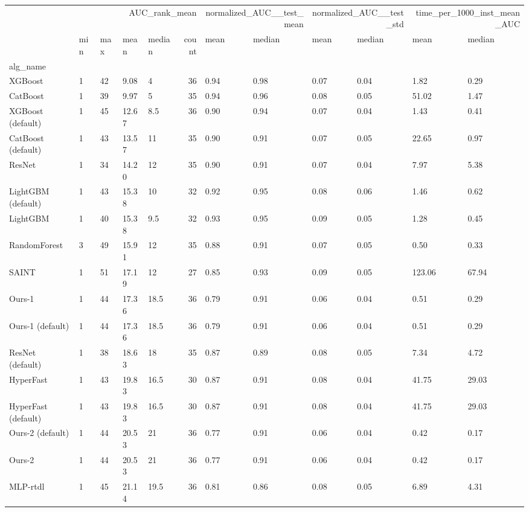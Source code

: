 \begin{tabular}{lllllrllllll}
\toprule
 & \multicolumn{5}{r}{AUC_rank_mean} & \multicolumn{2}{r}{normalized_AUC__test_mean} & \multicolumn{2}{r}{normalized_AUC__test_std} & \multicolumn{2}{r}{time_per_1000_inst_mean_AUC} \\
 & min & max & mean & median & count & mean & median & mean & median & mean & median \\
alg_name &  &  &  &  &  &  &  &  &  &  &  \\
\midrule
XGBoost & 1 & 42 & 9.08 & 4 & 36 & 0.94 & 0.98 & 0.07 & 0.04 & 1.82 & 0.29 \\
CatBoost & 1 & 39 & 9.97 & 5 & 35 & 0.94 & 0.96 & 0.08 & 0.05 & 51.02 & 1.47 \\
XGBoost (default) & 1 & 45 & 12.67 & 8.5 & 36 & 0.90 & 0.94 & 0.07 & 0.04 & 1.43 & 0.41 \\
CatBoost (default) & 1 & 43 & 13.57 & 11 & 35 & 0.90 & 0.91 & 0.07 & 0.05 & 22.65 & 0.97 \\
ResNet & 1 & 34 & 14.20 & 12 & 35 & 0.90 & 0.91 & 0.07 & 0.04 & 7.97 & 5.38 \\
LightGBM (default) & 1 & 43 & 15.38 & 10 & 32 & 0.92 & 0.95 & 0.08 & 0.06 & 1.46 & 0.62 \\
LightGBM & 1 & 40 & 15.38 & 9.5 & 32 & 0.93 & 0.95 & 0.09 & 0.05 & 1.28 & 0.45 \\
RandomForest & 3 & 49 & 15.91 & 12 & 35 & 0.88 & 0.91 & 0.07 & 0.05 & 0.50 & 0.33 \\
SAINT & 1 & 51 & 17.19 & 12 & 27 & 0.85 & 0.93 & 0.09 & 0.05 & 123.06 & 67.94 \\
Ours-1 & 1 & 44 & 17.36 & 18.5 & 36 & 0.79 & 0.91 & 0.06 & 0.04 & 0.51 & 0.29 \\
Ours-1 (default) & 1 & 44 & 17.36 & 18.5 & 36 & 0.79 & 0.91 & 0.06 & 0.04 & 0.51 & 0.29 \\
ResNet (default) & 1 & 38 & 18.63 & 18 & 35 & 0.87 & 0.89 & 0.08 & 0.05 & 7.34 & 4.72 \\
HyperFast & 1 & 43 & 19.83 & 16.5 & 30 & 0.87 & 0.91 & 0.08 & 0.04 & 41.75 & 29.03 \\
HyperFast (default) & 1 & 43 & 19.83 & 16.5 & 30 & 0.87 & 0.91 & 0.08 & 0.04 & 41.75 & 29.03 \\
Ours-2 (default) & 1 & 44 & 20.53 & 21 & 36 & 0.77 & 0.91 & 0.06 & 0.04 & 0.42 & 0.17 \\
Ours-2 & 1 & 44 & 20.53 & 21 & 36 & 0.77 & 0.91 & 0.06 & 0.04 & 0.42 & 0.17 \\
MLP-rtdl & 1 & 45 & 21.14 & 19.5 & 36 & 0.81 & 0.86 & 0.08 & 0.05 & 6.89 & 4.31 \\

\end{tabular}
